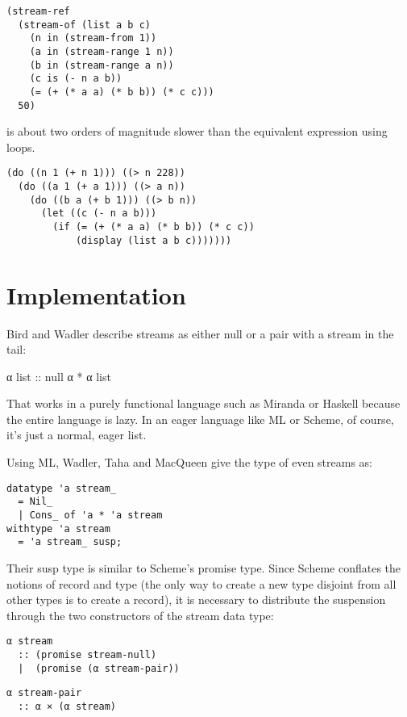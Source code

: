 \begin{verbatim}
(stream-ref
  (stream-of (list a b c)
    (n in (stream-from 1))
    (a in (stream-range 1 n))
    (b in (stream-range a n))
    (c is (- n a b))
    (= (+ (* a a) (* b b)) (* c c)))
  50)
\end{verbatim}

is about two orders of magnitude slower than the equivalent expression
using loops.

\begin{verbatim}
(do ((n 1 (+ n 1))) ((> n 228))
  (do ((a 1 (+ a 1))) ((> a n))
    (do ((b a (+ b 1))) ((> b n))
      (let ((c (- n a b)))
        (if (= (+ (* a a) (* b b)) (* c c))
            (display (list a b c)))))))
\end{verbatim}

\section{Implementation}\label{implementation}

Bird and Wadler describe streams as either null or a pair with a stream
in the tail:

α list :: null \textbar{} α * α list

That works in a purely functional language such as Miranda or Haskell
because the entire language is lazy. In an eager language like ML or
Scheme, of course, it's just a normal, eager list.

Using ML, Wadler, Taha and MacQueen give the type of even streams as:

\begin{verbatim}
datatype 'a stream_
  = Nil_
  | Cons_ of 'a * 'a stream
withtype 'a stream
  = 'a stream_ susp;
\end{verbatim}

Their susp type is similar to Scheme's promise type. Since Scheme
conflates the notions of record and type (the only way to create a new
type disjoint from all other types is to create a record), it is
necessary to distribute the suspension through the two constructors of
the stream data type:

\begin{verbatim}
α stream
  :: (promise stream-null)
  |  (promise (α stream-pair))
\end{verbatim}

\begin{verbatim}
α stream-pair
  :: α × (α stream)
\end{verbatim}

